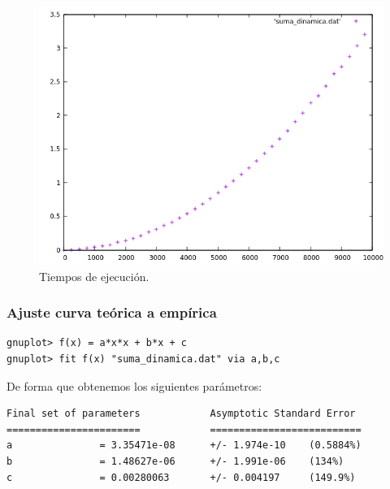 \begin{figure}[H]
    \begin{center}
        \includegraphics[scale=0.7]{imagenes/suma_dinamica.png}
        \caption{Tiempos de ejecución.}
        \label{fig19}
    \end{center}
\end{figure}

\subsubsection{Ajuste curva teórica a empírica}

\begin{shaded*}
\begin{verbatim}
gnuplot> f(x) = a*x*x + b*x + c
gnuplot> fit f(x) "suma_dinamica.dat" via a,b,c

\end{verbatim}
\end{shaded*}

De forma que obtenemos los siguientes parámetros:

\begin{shaded*}
\begin{verbatim}
Final set of parameters            Asymptotic Standard Error
=======================            ==========================
a               = 3.35471e-08      +/- 1.974e-10    (0.5884%)
b               = 1.48627e-06      +/- 1.991e-06    (134%)
c               = 0.00280063       +/- 0.004197     (149.9%)


\end{verbatim}
\end{shaded*}

